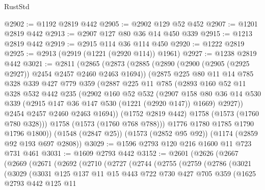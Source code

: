 \begin{lexlean}{RustStd}
\begin{coremodule}
@2902 := @1192 @2819 @442
@2905 := @2902 @129 @52 @452
@2907 := @1201 @2819 @442
@2913 := @2907 @127 @80 @36 @14 @450 @339
@2915 := @1213 @2819 @442
@2919 := @2915 @114 @36 @114 @450
@2920 := @1222 @2819
@2925 := @2913 (@2919 (@1221 (@2920 @114)) @1961)
@2927 := @1238 @2819 @442
@3021 := @2811
    (@2865
      (@2873
        (@2885
          (@2890 (@2900 (@2905 (@2925 @2927)) @2454 @2457 @2460 @2463 @1694))
          (@2875
            @225
            @80
            @11
            @14
            @785
            @328
            @339
            @427
            @779
            @359
            (@2887
              @225
              @11
              @785
              (@2893
                @160
                @52
                @11
                @328
                @532
                @442
                @235
                (@2902
                  @160
                  @52
                  @532
                  (@2907
                    @158
                    @80
                    @36
                    @14
                    @530
                    @339
                    (@2915 @147 @36 @147 @530 (@1221 (@2920 @147)) @1669)
                    @2927))
                @2454
                @2457
                @2460
                @2463
                @1694))
            (@1752 @2819 @442)
            @1758
            (@1573 (@1760 @780 @328)))
          @1758
          (@1573 (@1760 @768 @788)))
        @1776
        @1780
        @1785
        @1790
        @1796
        @1800))
    (@1548 (@2847 @25))
    (@1573 (@2852 @95 @92))
    (@1174 (@2859 @92 @193 @697 @2808))
@3029 := @1596 @2793 @120 @216 @1600 @11 @723 @731 @461
@3031 := @1609 @2793 @442
@3152 := @2601
    (@2626
      (@2667
        (@2669
          (@2671
            (@2692
              (@2710
                (@2727
                  (@2744
                    (@2755
                      (@2759
                        (@2786
                          (@3021
                            (@3029
                              (@3031
                                @125
                                @137
                                @11
                                @15
                                @443
                                @722
                                @730
                                @427
                                @705
                                @359
                                (@1625
                                  @2793
                                  @442
                                  @125
                                  @11

\end{coremodule}
\end{lexlean}
